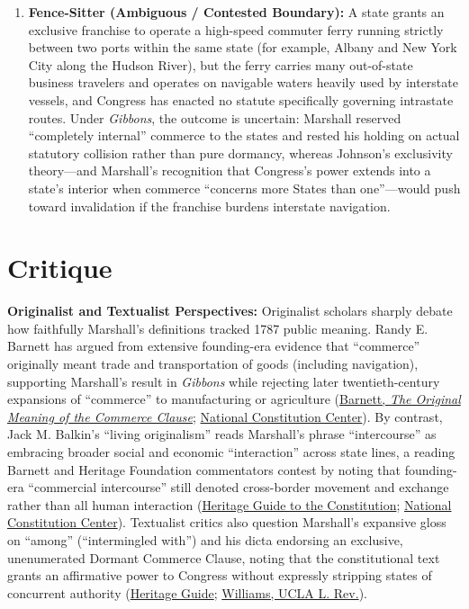\documentclass[12pt]{article}
\begin{document}
\begin{enumerate}
\item \textbf{Fence-Sitter (Ambiguous / Contested Boundary):} A state grants an exclusive franchise to operate a high-speed commuter ferry running strictly between two ports within the same state (for example, Albany and New York City along the Hudson River), but the ferry carries many out-of-state business travelers and operates on navigable waters heavily used by interstate vessels, and Congress has enacted no statute specifically governing intrastate routes. Under \textit{Gibbons}, the outcome is uncertain: Marshall reserved ``completely internal'' commerce to the states and rested his holding on actual statutory collision rather than pure dormancy, whereas Johnson's exclusivity theory---and Marshall's recognition that Congress's power extends into a state's interior when commerce ``concerns more States than one''---would push toward invalidation if the franchise burdens interstate navigation.
\end{enumerate}

\section{Critique}
\textbf{Originalist and Textualist Perspectives:} Originalist scholars sharply debate how faithfully Marshall's definitions tracked 1787 public meaning. Randy E. Barnett has argued from extensive founding-era evidence that ``commerce'' originally meant trade and transportation of goods (including navigation), supporting Marshall's result in \textit{Gibbons} while rejecting later twentieth-century expansions of ``commerce'' to manufacturing or agriculture (\href{https://scholarship.law.georgetown.edu/context/facpub/article/1504/viewcontent/barnett_commerce_clause.pdf}{Barnett, \textit{The Original Meaning of the Commerce Clause}}; \href{https://constitutioncenter.org/the-constitution/articles/article-i/clauses/752}{National Constitution Center}). By contrast, Jack M. Balkin's ``living originalism'' reads Marshall's phrase ``intercourse'' as embracing broader social and economic ``interaction'' across state lines, a reading Barnett and Heritage Foundation commentators contest by noting that founding-era ``commercial intercourse'' still denoted cross-border movement and exchange rather than all human interaction (\href{https://constitution.heritage.org/essays/a1-s8-c3-b/}{Heritage Guide to the Constitution}; \href{https://constitutioncenter.org/the-constitution/articles/article-i/clauses/752}{National Constitution Center}). Textualist critics also question Marshall's expansive gloss on ``among'' (``intermingled with'') and his dicta endorsing an exclusive, unenumerated Dormant Commerce Clause, noting that the constitutional text grants an affirmative power to Congress without expressly stripping states of concurrent authority (\href{https://constitution.heritage.org/essays/a1-s8-c3-b/}{Heritage Guide}; \href{https://www.uclalawreview.org/wp-content/uploads/2019/09/11_53UCLALRev1532005-2006.pdf}{Williams, UCLA L. Rev.}).
\end{document}
